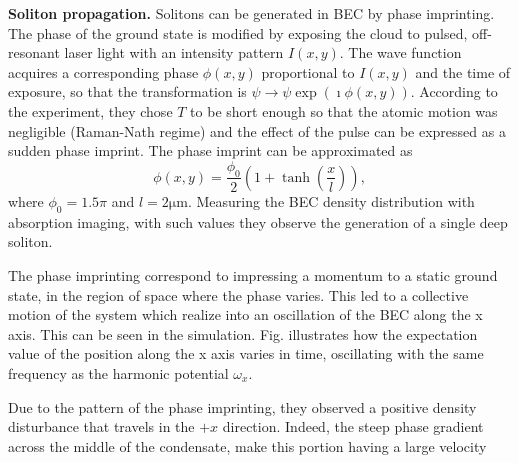\noindent \textbf{Soliton propagation.} Solitons can be generated in BEC by phase imprinting. The phase of the ground state is modified by exposing the cloud to pulsed, off-resonant laser light with an intensity pattern $I(x,y)$. The wave function acquires a corresponding phase $\phi(x,y)$ proportional to $I(x,y)$ and the time of exposure, so that the transformation is $\psi \rightarrow \psi \exp(\imath \phi(x,y))$. According to the experiment, they chose $T$ to be short enough so that the atomic motion was negligible (Raman-Nath regime) and the effect of the pulse can be expressed as a sudden phase imprint. The phase imprint can be approximated as
\begin{equation}
\phi(x,y) = \frac{\phi_0}{2} \left(1 + \tanh\left(\frac{x}{l}\right)\right),
\end{equation}
where $\phi_0 = 1.5\pi$ and $l=2 \mathrm{\mu m}$. Measuring the BEC density distribution with absorption imaging, with such values they observe the generation of a single deep soliton.

The phase imprinting correspond to impressing a momentum to a static ground state, in the region of space where the phase varies. This led to a collective motion of the system which realize into an oscillation of the BEC along the x axis. This can be seen in the simulation. Fig. %
 illustrates how the expectation value of the position along the x axis varies in time, oscillating with the same frequency as the harmonic potential $\omega_x$.

Due to the pattern of the phase imprinting, they observed a positive density disturbance that travels in the $+x$ direction. Indeed, the steep phase gradient across the middle of the condensate, make this portion having a large velocity 


